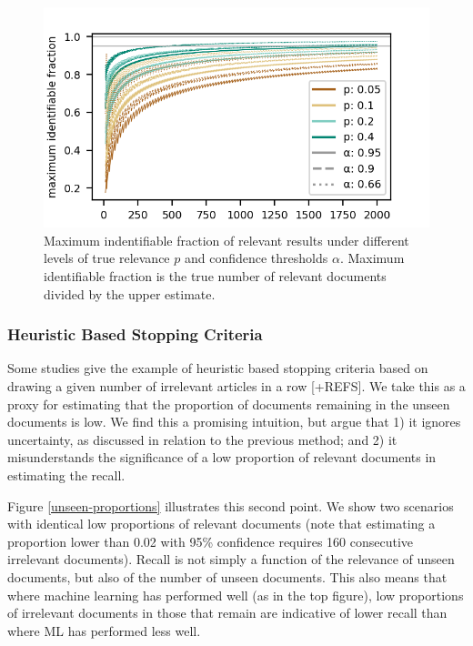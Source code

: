 \documentclass{bmcart}
\begin{document}
\begin{figure}
	\includegraphics[width=0.5\linewidth]{../images/bir_variation.png}
	\caption{Maximum indentifiable fraction of relevant results under different levels of true relevance $p$ and confidence thresholds $\alpha$. Maximum identifiable fraction is the true number of relevant documents divided by the upper estimate.}
	\label{bir-variation}
\end{figure}

		
\subsubsection*{Heuristic Based Stopping Criteria}

Some studies give the example of heuristic based stopping criteria based on drawing a given number of irrelevant articles in a row \cite{Przybya2018} [+REFS]. We take this as a proxy for estimating that the proportion of documents remaining in the unseen documents is low. We find this a promising intuition, but argue that 1) it ignores uncertainty, as discussed in relation to the previous method; and 2) it misunderstands the significance of a low proportion of relevant documents in estimating the recall.

Figure \ref{unseen-proportions} illustrates this second point. We show two scenarios with identical low proportions of relevant documents (note that estimating a proportion lower than 0.02 with 95\% confidence requires 160 consecutive irrelevant documents). Recall is not simply a function of the relevance of unseen documents, but also of the number of unseen documents. This also means that where machine learning has performed well (as in the top figure), low proportions of irrelevant documents in those that remain are indicative of lower recall than where ML has performed less well.
\end{document}
